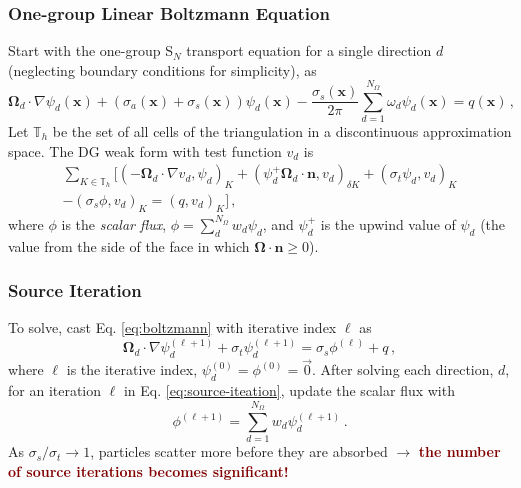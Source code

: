 \documentclass[xcolor={usenames,dvipsnames,svgnames,table}, 10pt]{beamer}
\newcommand{\vx}{\mathbf{x}} %
\newcommand{\vo}{\pmb{\Omega}} %
\newcommand{\vn}{\mathbf{n}} %
\newcommand{\pinp}[2]{\left(#1,#2\right)}
\begin{document}
\begin{frame}\frametitle{One-group Linear Boltzmann Equation}
	Start with the one-group S$_N$ transport equation for a single direction $d$ (neglecting boundary conditions for simplicity), as
	\begin{equation}
		\label{eq:boltzmann}
		\vo_d \cdot \nabla \psi_d(\vx) + \left(\sigma_a(\vx) + \sigma_s(\vx)\right) \psi_d(\vx) - \frac{\sigma_s(\vx)}{2\pi} \sum_{d = 1}^{N_\Omega} \omega_d \psi_d(\vx) = q(\vx)\,,
	\end{equation}
	Let $\mathbb{T}_h$ be the set of all cells of the triangulation in a discontinuous approximation space. The DG weak form with test function $v_d$ is
	\begin{multline}
		\sum_{K \in \mathbb{T}_h} \Big[ \pinp{-\vo_d \cdot \nabla v_d}{\psi_d}_K + \pinp{\psi_d^+ \vo_d \cdot \vn}{v_d}_{\delta K} + \pinp{\sigma_t \psi_d}{v_d}_K  \\ - \pinp{\sigma_s \phi}{v_d}_K = \pinp{q}{v_d}_K\Big]\,,
	\end{multline}
	where $\phi$ is the \textit{scalar flux}, $\phi = \sum_d^{N_\Omega} w_d \psi_d$, and $\psi_d^+$ is the upwind value of $\psi_d$ (the value from the side of the face in which $\vo \cdot \vn \geq 0$).
\end{frame}


\begin{frame}\frametitle{Source Iteration}
	To solve, cast Eq. \eqref{eq:boltzmann} with iterative index $\ell$ as
	\begin{equation}
		\label{eq:source-iteation}
		\vo_d \cdot \nabla \psi_d^{(\ell + 1)} + \sigma_t \psi_d^{(\ell + 1)} = \sigma_s \phi^{(\ell)} + q\,,
	\end{equation}
	where $\ell$ is the iterative index, $\psi_d^{(0)} = \phi^{(0)} = \vec{0}$. After solving each direction, $d$, for an iteration $\ell$ in Eq. \eqref{eq:source-iteation}, update the scalar flux with
	\[
		\phi^{(\ell + 1)} = \sum_{d = 1}^{N_\Omega} w_d \psi_d^{(\ell + 1)}\,.
	\]
	As $\sigma_s / \sigma_t \to 1$, particles scatter more before they are absorbed $\rightarrow$ \textbf{\textcolor{Maroon}{the number of source iterations becomes significant!}} 
\end{frame}

\end{document}
